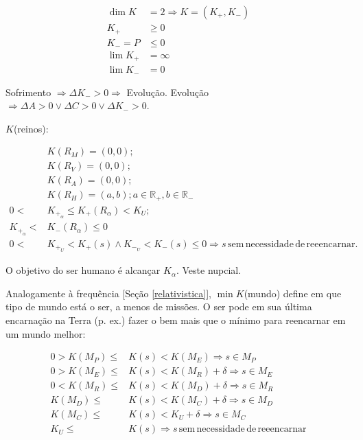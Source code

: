 \documentclass[12pt,a4paper]{article}
\begin{document}
			\begin{align*}
				\dim K &= 2 \Rightarrow K = (K_+, K_-) \\
				K_+ &\ge 0 \\
				K_- = P &\le 0 \\
				\lim K_+ &= \infty \\
				\lim K_- &= 0
			\end{align*}

			Sofrimento $\Rightarrow \Delta K_- > 0 \Rightarrow $ Evolu\c{c}\~ao. Evolu\c{c}\~ao $\Rightarrow \Delta A > 0 \vee \Delta C > 0 \vee \Delta K_- > 0$.

			$K$(reinos):

			\begin{align*}
				&K(R_M) = (0,0); \\
				&K(R_V) = (0,0); \\
				&K(R_A) = (0,0); \\
				&K(R_H) = (a,b); a \in \mathbb{R}_+, b \in \mathbb{R}_- \\
				0 < &K_{+_\alpha} \le K_+(R_\alpha) < K_U; \\
				K_{+_\alpha} < &K_-(R_\alpha) \le 0 \\
				0 < &K_{+_U} < K_+(s) \wedge K_{-_U} < K_-(s) \le 0 \Rightarrow s \mathrm{\,sem\,necessidade\,de\,reeencarnar.}
			\end{align*}

			O objetivo do ser humano \'e alcan\c{c}ar $K_\alpha$. Veste nupcial\cite{batista}.

			Analogamente \`a frequ\^encia [Se\c{c}\~ao \ref{relativistica}], $\min K$(mundo) define em que tipo de mundo est\'a o ser, a menos de miss\~oes. O ser pode em sua \'ultima encarna\c{c}\~ao na Terra (p. ex.) fazer o bem mais que o m\'inimo para reencarnar em um mundo melhor:

			\begin{align*}
				0 > K(M_P) \le &K(s) < K(M_E) \Rightarrow s \in M_P \\
				0 > K(M_E) \le &K(s) < K(M_R) + \delta \Rightarrow s \in M_E \\
				0 < K(M_R) \le &K(s) < K(M_D) + \delta \Rightarrow s \in M_R \\
				K(M_D) \le &K(s) < K(M_C) + \delta \Rightarrow s \in M_D \\
				K(M_C) \le &K(s) < K_U + \delta \Rightarrow s \in M_C \\
				K_U \le &K(s) \Rightarrow s \mathrm{\,sem\,necessidade\,de\,reeencarnar}
			\end{align*}
\end{document}
